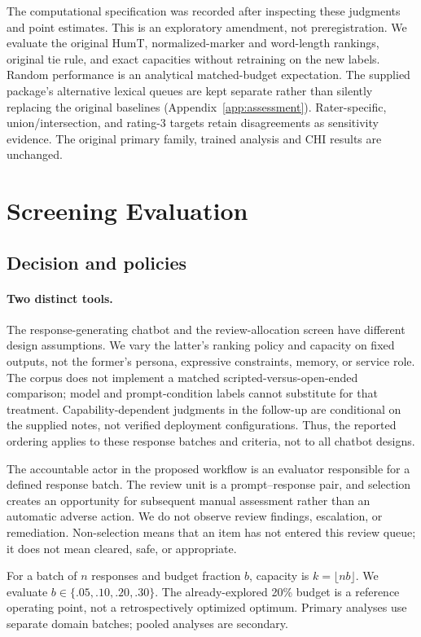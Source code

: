 \documentclass[manuscript,screen,review,anonymous]{acmart}
\begin{document}
The computational specification was recorded after inspecting these judgments and point estimates. This is an exploratory amendment, not preregistration. We evaluate the original HumT, normalized-marker and word-length rankings, original tie rule, and exact capacities without retraining on the new labels. Random performance is an analytical matched-budget expectation. The supplied package's alternative lexical queues are kept separate rather than silently replacing the original baselines (Appendix~\ref{app:assessment}). Rater-specific, union/intersection, and rating-3 targets retain disagreements as sensitivity evidence. The original primary family, trained analysis and CHI results are unchanged.

\section{Screening Evaluation}
\subsection{Decision and policies}
\paragraph{Two distinct tools.}
The response-generating chatbot and the review-allocation screen have different design assumptions. We vary the latter's ranking policy and capacity on fixed outputs, not the former's persona, expressive constraints, memory, or service role. The corpus does not implement a matched scripted-versus-open-ended comparison; model and prompt-condition labels cannot substitute for that treatment. Capability-dependent judgments in the follow-up are conditional on the supplied notes, not verified deployment configurations. Thus, the reported ordering applies to these response batches and criteria, not to all chatbot designs.

The accountable actor in the proposed workflow is an evaluator responsible for a defined response batch. The review unit is a prompt--response pair, and selection creates an opportunity for subsequent manual assessment rather than an automatic adverse action. We do not observe review findings, escalation, or remediation. Non-selection means that an item has not entered this review queue; it does not mean cleared, safe, or appropriate.

For a batch of $n$ responses and budget fraction $b$, capacity is $k=\lfloor nb\rfloor$. We evaluate $b\in\{.05,.10,.20,.30\}$. The already-explored 20\% budget is a reference operating point, not a retrospectively optimized optimum. Primary analyses use separate domain batches; pooled analyses are secondary.
\end{document}
